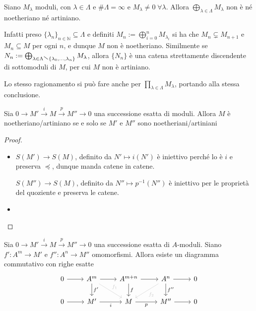 \begin{example}{}
    Siano \(M_\lambda\) moduli, con \(\lambda \in \Lambda\) e \(\#\Lambda =
    \infty\) e \(M_\lambda \neq 0 \; \forall \lambda\). Allora
    \(\bigoplus_{\lambda \in \Lambda} M_\lambda\) non è né noetheriano né
    artiniano.

    Infatti preso \(\{\lambda_{n}\}_{n \in \mathbb{N}} \subseteq \Lambda  \) e
    definiti \(M_{n} := \bigoplus_{i=0} ^{n} M_{\lambda_{i}} \) si ha che
    \(M_{n} \subsetneq M_{n+1}  \) e \(M_{n} \subseteq M \) per ogni \(n\), e
    dunque \(M\) non è noetheriano. Similmente se \(N_n := \bigoplus_{\lambda \in
    \Lambda \sminus \{\lambda_{0}, \dots, \lambda_{n}\} } M_\lambda\), allora
    \(\{N_n\} \) è una catena strettamente discendente di sottomoduli di \(M\),
    per cui \(M\) non è artiniano.

    Lo stesso ragionamento si può fare anche per \(\prod_{\lambda \in \Lambda}
    M_\lambda \), portando alla stessa conclusione.
\end{example}

\begin{proposition}
    Sia \(0 \to M' \overset{i}{\to} M \overset{p}{\to} M'' \to 0\) una
    successione esatta di moduli. Allora \(M\) è noetheriano/artiniano se e solo
    se \(M'\) e \(M''\) sono noetheriani/artiniani
\end{proposition}
\begin{proof}\( \)
\begin{itemize}
    \item[\(\implies \)] \(S{(M')} \to S{(M)}\), definito da \(N' \mapsto
        i{(N')}\) è iniettivo perché lo è \(i\) e preserva \(\preccurlyeq\),
        dunque manda catene in catene.

        \(S{(M'')} \to S{(M)}\), definito da \(N'' \mapsto p^{-1}{(N'')}\) è
        iniettivo per le proprietà del quoziente e preserva le catene.
    \item[\(\impliedby \)] 
\end{itemize}
\end{proof}



\begin{lemma}{}\label{lem:com}
    Sia \(0 \to M' \overset{i}{\to } M \overset{p}{\to } M'' \to 0\) una successione
    esatta di \(A\)-moduli. Siano \(f': A^{m} \to M'\) e \(f'' : A^{n}\to M''\)
    omomorfismi. Allora esiste un diagramma commutativo con righe esatte
\[\begin{tikzcd}
	0 & {A^{m}} & {A^{m+n}} & {A^{n}} & 0 \\
	0 & {M'} & M & {M''} & 0
	\arrow[from=1-1, to=1-2]
	\arrow[from=1-2, to=1-3]
	\arrow["{{f'}}", from=1-2, to=2-2]
	\arrow["{f_1}", color={rgb,255:red,199;green,199;blue,199}, from=1-2, to=2-3]
	\arrow[from=1-3, to=1-4]
	\arrow["f", from=1-3, to=2-3]
	\arrow[from=1-4, to=1-5]
	\arrow["{f_2}", color={rgb,255:red,199;green,199;blue,199}, from=1-4, to=2-3]
	\arrow["{{f''}}", from=1-4, to=2-4]
	\arrow[from=2-1, to=2-2]
	\arrow["i"', from=2-2, to=2-3]
	\arrow["p"', from=2-3, to=2-4]
	\arrow[from=2-4, to=2-5]
\end{tikzcd}\]
\end{lemma}

